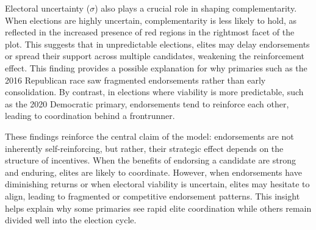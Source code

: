 Electoral uncertainty ($\sigma$) also plays a crucial role in shaping complementarity. When elections are highly uncertain, complementarity is less likely to hold, as reflected in the increased presence of red regions in the rightmost facet of the plot. This suggests that in unpredictable elections, elites may delay endorsements or spread their support across multiple candidates, weakening the reinforcement effect. This finding provides a possible explanation for why primaries such as the 2016 Republican race saw fragmented endorsements rather than early consolidation. By contrast, in elections where viability is more predictable, such as the 2020 Democratic primary, endorsements tend to reinforce each other, leading to coordination behind a frontrunner.

These findings reinforce the central claim of the model: endorsements are not inherently self-reinforcing, but rather, their strategic effect depends on the structure of incentives. When the benefits of endorsing a candidate are strong and enduring, elites are likely to coordinate. However, when endorsements have diminishing returns or when electoral viability is uncertain, elites may hesitate to align, leading to fragmented or competitive endorsement patterns. This insight helps explain why some primaries see rapid elite coordination while others remain divided well into the election cycle.
